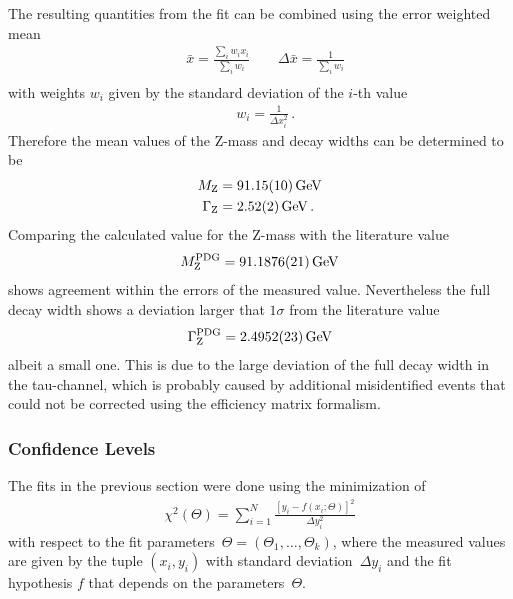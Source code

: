 \documentclass[11pt, a4paper]{article}
\numberwithin{equation}{section}
\begin{document}
The resulting quantities from the fit can be combined using the error weighted mean
\begin{align*}
	&\bar{x} = \frac{\sum_i w_i x_i}{\sum_i w_i} \qquad \Delta \bar{x} = \frac{1}{\sum_i w_i}\\	
\end{align*}
with weights $w_i$ given by the standard deviation of the $i$-th value
\begin{align*}
	&w_i = \frac{1}{\Delta x_i^2} \, \text{.}
\end{align*}
Therefore the mean values of the Z-mass and decay widths can be determined to be
\begin{align*}
	M_\mathrm{Z} &= \SI{91.15 +- 0.10}{GeV}\\
	\Gamma_\mathrm{Z} &= \SI{2.52 +- 0.02}{GeV} \,\text{.}
\end{align*}
Comparing the calculated value for the Z-mass with the literature value \cite{pdg}
\begin{align*}
	M_\mathrm{Z}^\mathrm{PDG} = \SI{91.1876 +- 0.0021}{GeV}
\end{align*}
shows agreement within the errors of the measured value.
Nevertheless the full decay width shows a deviation larger that $1\sigma$ from the literature value \cite{pdg}
\begin{align*}
	\Gamma_\mathrm{Z}^\mathrm{PDG} = \SI{2.4952 +- 0.0023}{GeV}
\end{align*}
albeit a small one.
This is due to the large deviation of the full decay width in the tau-channel, which is probably caused by additional misidentified events that could not be corrected using the efficiency matrix formalism.

\subsubsection{Confidence Levels}
\label{sec:confidence_levels}
The fits in the previous section were done using the minimization of
\begin{align*}
	\chi^2\left(\Theta\right) = \sum_{i = 1}^{N} \frac{\left[ y_i - f\left(x_i; \Theta\right) \right]^2}{\Delta y_i^2}
\end{align*}
with respect to the fit parameters~$\Theta = (\Theta_1, \dots, \Theta_k)$, where the measured values are given by the tuple $(x_i, y_i)$ with standard deviation~$\Delta y_i$ and the fit hypothesis $f$ that depends on the parameters~$\Theta$.
\end{document}
